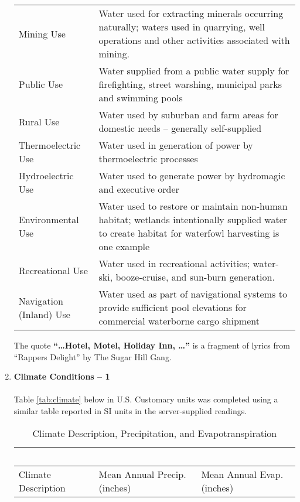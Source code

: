 \documentclass[12pt]{article}
\begin{document}
\begin{enumerate}
\begin{table}[h!]
\begin{tabular}{p{1.7in}p{4.3in}}
Mining Use & Water used for extracting minerals occurring naturally; waters used in quarrying, well operations and other activities associated with mining.\\
Public Use & Water supplied from a public water supply for firefighting, street warshing, municipal parks and swimming pools\\
Rural Use & Water used by suburban and farm areas for domestic needs -- generally self-supplied\\
Thermoelectric Use & Water used in generation of power by thermoelectric processes \\
Hydroelectric Use & Water used to generate power by hydromagic and executive order \\ %
Environmental Use & Water used to restore or maintain non-human habitat; wetlands intentionally supplied water to create habitat for waterfowl harvesting is one example\\

Recreational Use & Water used in recreational activities; water-ski, booze-cruise, and sun-burn generation.  \\

Navigation (Inland) Use & Water used as part of navigational systems to provide sufficient pool elevations for commercial waterborne cargo shipment\\

\hline
\hline
   \end{tabular}
   \label{tab:water-use}
\end{table}
The quote \textbf{``\dots Hotel, Motel, Holiday Inn, \dots''} is a fragment of lyrics from ``Rappers Delight'' by The Sugar Hill Gang.
\clearpage
\item{{\textbf{Climate Conditions -- 1}}}~\\~\\
Table \ref{tab:climate} below in U.S. Customary units was completed using a similar table reported in SI units in the server-supplied readings.
\begin{table}[htbp]
   \centering
   \caption{Climate Description, Precipitation, and Evapotranspiration}
   \begin{tabular}{p{1.5in}p{2.25in}p{2.25in}} %
   ~ & ~ & ~\\
\hline \hline
Climate Description & Mean Annual Precip. (inches) & Mean Annual Evap. (inches) \\
\hline


\end{tabular}
\end{table}
\end{enumerate}
\end{document}
